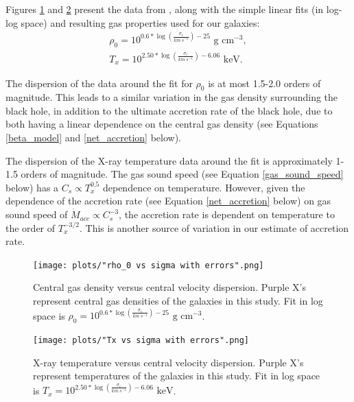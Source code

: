 \documentclass[fleqn,usenatbib,useAMS]{mnras}
\begin{document}
Figures \ref{fig:rho0_vs_sigma} and \ref{fig:Tx_vs_sigma} present the data from \citet{2018ApJ...857...32B}, along with the simple linear fits (in log-log space) and resulting gas properties used for our galaxies:
\begin{subequations} \label{eq:gas_properties}
\begin{eqnarray}
    \rho_0 = 10^{0.6*\log\left(\frac{\sigma_c}{km\ s^{-1}}\right) - 25} \text{  g cm}^{-3},\\
    T_x = 10^{2.50*\log\left(\frac{\sigma_c}{km\ s^{-1}}\right) - 6.06} \text{  keV}.
\end{eqnarray}
\end{subequations}

The dispersion of the data around the fit for $\rho_0$ is at most 1.5-2.0 orders of magnitude.  This leads to a similar variation in the gas density surrounding the black hole, in addition to the ultimate accretion rate of the black hole, due to both having a linear dependence on the central gas density (see Equations \eqref{beta_model} and \eqref{net_accretion} below).

The dispersion of the X-ray temperature data around the fit is approximately 1-1.5 orders of magnitude.  The gas sound speed (see Equation \eqref{gas_sound_speed} below) has a $C_s{\propto}T_x^{0.5}$ dependence on temperature.  However, given the dependence of the accretion rate (see Equation \eqref{net_accretion} below) on gas sound speed of $\dot{M}_{acc}{\propto}C_s^{-3}$, the accretion rate is dependent on temperature to the order of $T_x^{-3/2}$.  This is another source of variation in our estimate of accretion rate.

\begin{figure}
\vspace{20pt}%
\begin{center}
\texttt{[image: plots/"rho\_0 vs sigma with errors".png]}
\caption{Central gas density versus central velocity dispersion.  Purple X's represent central gas densities of the galaxies in this study.  Fit in log space is $\rho_0 = 10^{0.6*\log\left(\frac{\sigma_c}{km\ s^{-1}}\right) - 25} \text{  g cm}^{-3}$.}
\label{fig:rho0_vs_sigma}
\end{center}
\end{figure}

\begin{figure}
\vspace{20pt}%
\begin{center}
\texttt{[image: plots/"Tx vs sigma with errors".png]}
\caption{X-ray temperature versus central velocity dispersion.  Purple X's represent temperatures of the galaxies in this study.  Fit in log space is $T_x = 10^{2.50*\log\left(\frac{\sigma_c}{km\ s^{-1}}\right) - 6.06} \text{  keV}$.}
\label{fig:Tx_vs_sigma}
\end{center}
\end{figure}
\end{document}
